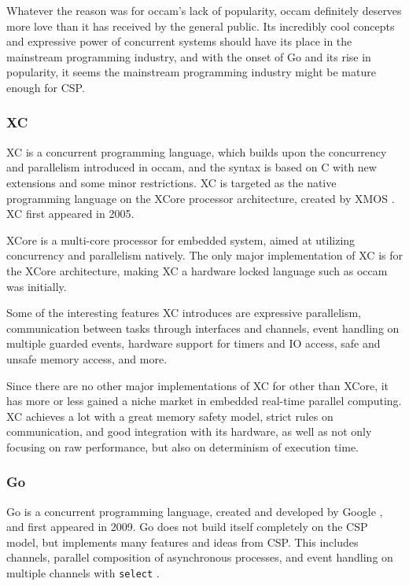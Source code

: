 Whatever the reason was for occam's lack of popularity, occam definitely deserves more love than it has received by the general public. Its incredibly cool concepts and expressive power of concurrent systems should have its place in the mainstream programming industry, and with the onset of Go and its rise in popularity, it seems the mainstream programming industry might be mature enough for CSP.


\subsubsection{XC}
\label{sssec:xc}

XC is a concurrent programming language, which builds upon the concurrency and parallelism introduced in occam, and the syntax is based on C with new extensions and some minor restrictions. XC is targeted as the native programming language on the XCore processor architecture, created by XMOS \citep{xc}. XC first appeared in 2005.

XCore is a multi-core processor for embedded system, aimed at utilizing concurrency and parallelism natively. The only major implementation of XC is for the XCore architecture, making XC a hardware locked language such as occam was initially. 

Some of the interesting features XC introduces are expressive parallelism, communication between tasks through interfaces and channels, event handling on multiple guarded events, hardware support for timers and IO access, safe and unsafe memory access, and more.

Since there are no other major implementations of XC for other than XCore, it has more or less gained a niche market in embedded real-time parallel computing. XC achieves a lot with a great memory safety model, strict rules on communication, and good integration with its hardware, as well as not only focusing on raw performance, but also on determinism of execution time. 

\subsubsection{Go}
\label{sssec:go}

Go is a concurrent programming language, created and developed by Google \citep{golangintro}, and first appeared in 2009. Go does not build itself completely on the CSP model, but implements many features and ideas from CSP. This includes channels, parallel composition of asynchronous processes, and event handling on multiple channels with \texttt{select} \citep{golangspec}.

